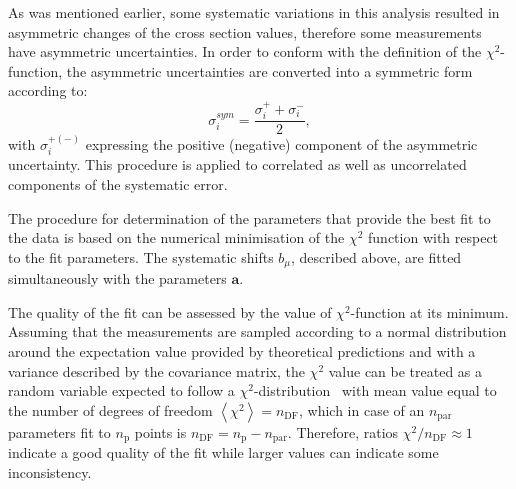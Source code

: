 As was mentioned earlier, some systematic variations in this analysis resulted in asymmetric changes of the cross section values, therefore some measurements have asymmetric uncertainties. In order to conform with the definition of the $\chi^2$-function, the asymmetric uncertainties are converted into a symmetric form according to:
\begin{equation}
 \sigma_i^{sym} = \frac{\sigma_i^+ + \sigma_i^-}{2},
\end{equation}
with $\sigma_i^{+\left(-\right)}$ expressing the positive (negative) component of the asymmetric uncertainty. This procedure is applied to correlated as well as uncorrelated components of the systematic error.

The procedure for determination of the parameters that provide the best fit to the data is based on the numerical minimisation of the $\chi^2$ function with respect to the fit parameters. The systematic shifts $b_\mu$, described above, are fitted simultaneously with the parameters $\mathbf{a}$.

The quality of the fit can be assessed by the value of $\chi^2$-function at its minimum. Assuming that the measurements are sampled according to a normal distribution around the expectation value provided by theoretical predictions and with a variance described by the covariance matrix, the $\chi^2$ value can be treated as a random variable expected to follow a $\chi^2$-distribution~\cite{PDG:2014}
with mean value equal to the number of degrees of freedom $\left\langle \chi^2 \right\rangle = n_\text{DF}$, which in case of an $n_\text{par}$ parameters fit to $n_\text{p}$ points is $n_\text{DF}=n_\text{p}-n_\text{par}$.
Therefore, ratios $\chi^2/n_\text{DF} \approx 1$ indicate a good quality of the fit while larger values can indicate some inconsistency.
